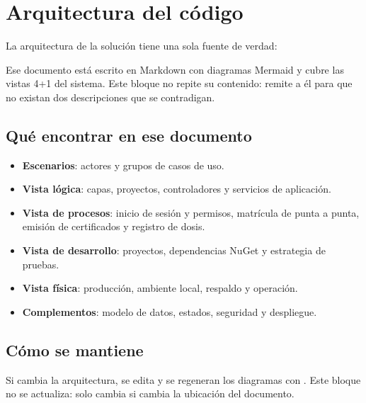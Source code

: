 \section{Arquitectura del código}

La arquitectura de la solución tiene una sola fuente de verdad:

\begin{center}
\end{center}

Ese documento está escrito en Markdown con diagramas Mermaid y cubre las
vistas 4+1 del sistema. Este bloque no repite su contenido: remite a él para
que no existan dos descripciones que se contradigan.

\subsection{Qué encontrar en ese documento}

\begin{itemize}[leftmargin=*,itemsep=0.25em]
\item \textbf{Escenarios}: actores y grupos de casos de uso.
\item \textbf{Vista lógica}: capas, proyectos, controladores y servicios de
  aplicación.
\item \textbf{Vista de procesos}: inicio de sesión y permisos, matrícula de
  punta a punta, emisión de certificados y registro de dosis.
\item \textbf{Vista de desarrollo}: proyectos, dependencias NuGet y estrategia
  de pruebas.
\item \textbf{Vista física}: producción, ambiente local, respaldo y operación.
\item \textbf{Complementos}: modelo de datos, estados, seguridad y despliegue.
\end{itemize}


\subsection{Cómo se mantiene}

Si cambia la arquitectura, se edita  y se
regeneran los diagramas con . Este bloque no se
actualiza: solo cambia si cambia la ubicación del documento.

